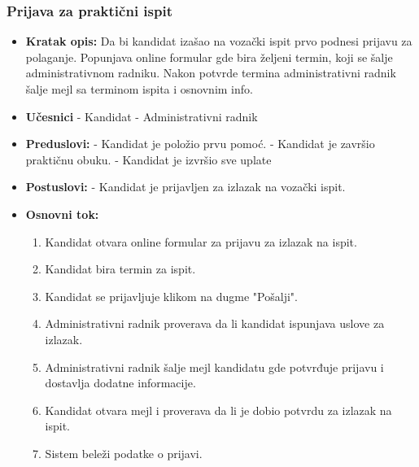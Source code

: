 \subsubsection{Prijava za praktični ispit}

\vspace{3mm}

\begin{itemize}

\item \textbf{Kratak opis:} Da bi kandidat izašao na vozački ispit prvo podnesi prijavu za polaganje. Popunjava online formular gde bira željeni termin, koji se  šalje administrativnom radniku. Nakon potvrde termina administrativni radnik šalje mejl sa terminom ispita i osnovnim info.

\vspace{2mm}

\item \textbf{Učesnici} \newline
   - Kandidat \newline   
   - Administrativni radnik 
   
\item \textbf{Preduslovi:} \newline
   - Kandidat je položio prvu pomoć. \newline
   - Kandidat je završio praktičnu obuku. \newline
   - Kandidat je izvršio sve uplate

\item \textbf{Postuslovi:} \newline
    - Kandidat je prijavljen za izlazak na vozački ispit.

\item \textbf{Osnovni tok:}  
   \begin{enumerate}
   \item Kandidat otvara online formular za prijavu za izlazak na ispit.
   \item Kandidat bira termin za ispit.
   \item Kandidat se prijavljuje klikom na dugme "Pošalji".
   \item Administrativni radnik proverava da li kandidat ispunjava uslove za izlazak.
   \item Administrativni radnik šalje mejl kandidatu gde potvrđuje prijavu i dostavlja dodatne informacije.
   \item Kandidat otvara mejl i proverava da li je dobio potvrdu za izlazak na ispit. 
   \item Sistem beleži podatke o prijavi. 
   \end{enumerate}


\end{itemize}
